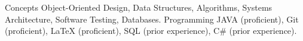 \begin{cvskills}
  \cvskill
    {Concepts}
    {Object-Oriented Design, Data Structures, Algorithms, Systems Architecture, Software Testing, Databases.}
  \cvskill
    {Programming}
    {JAVA (proficient), Git (proficient), LaTeX (proficient), SQL (prior experience), C\# (prior experience).}    
\end{cvskills}
